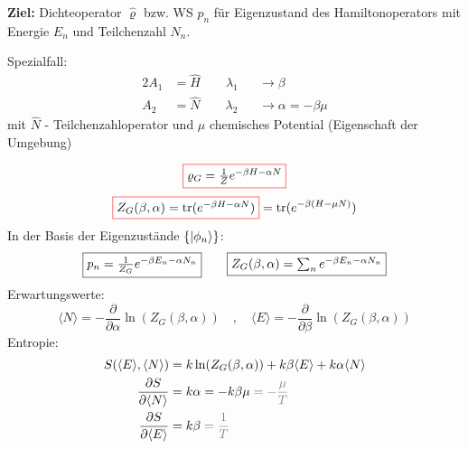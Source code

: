 \textbf{Ziel:} Dichteoperator $\hat{\varrho}$ bzw. WS $p_n$ für Eigenzustand des Hamiltonoperators mit Energie $E_n$ und Teilchenzahl $N_n$.
\vspace{0.5cm}


Spezialfall: 
\begin{alignat}{2}
    A_1 &= \hat{H} \qquad \lambda_1 &&\rightarrow \beta \\
    A_2 &= \hat{N} \qquad \lambda_2 &&\rightarrow \alpha = - \beta \mu
\end{alignat}
mit $\hat{N}$ - Teilchenzahloperator und $\mu$ chemisches Potential (Eigenschaft der Umgebung)

\begin{equation}
    \fcolorbox{red}{white}{$\varrho_G = \frac{1}{Z} e^{-\beta H - \alpha N}$}
\end{equation}
\begin{equation}
    \fcolorbox{red}{white}{$Z_G(\beta,\alpha) = \trace(e^{-\beta H - \alpha N})$} = \trace(e^{- \beta (H-\mu N)})
\end{equation}
In der Basis der Eigenzustände $\{\ket{\phi_n}\}$:
\begin{equation}
    \fcolorbox{black}{white}{$p_n = \frac{1}{Z_G} e^{-\beta E_n - \alpha N_n}$} \qquad \fcolorbox{black}{white}{$Z_G(\beta, \alpha) = \sum_n e^{- \beta E_n - \alpha N_n}$} 
\end{equation}
Erwartungswerte:
\begin{equation}
    \langle N \rangle = - \frac{\partial}{\partial \alpha} \ln(Z_G(\beta,\alpha)) \quad , \quad \langle E \rangle = - \frac{\partial}{\partial \beta} \ln(Z_G(\beta,\alpha))
\end{equation}
Entropie:
\begin{align}
    S(\langle E \rangle,\langle N \rangle) &= k \ln(Z_G(\beta,\alpha)) + k \beta \langle E \rangle + k \alpha \langle N \rangle \\
    \frac{\partial S}{\partial \langle N \rangle} &= k \alpha = - k \beta \mu \color{black!50!white} = - \frac{\mu}{T} \color{black} \\
    \frac{\partial S}{\partial \langle E \rangle} &= k \beta \color{black!50!white} = \frac{1}{T} \color{black}
\end{align}




